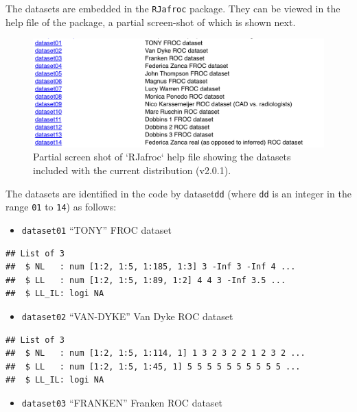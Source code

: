 \documentclass[
]{book}
\providecommand{\tightlist}{%
  \setlength{\itemsep}{0pt}\setlength{\parskip}{0pt}}
\begin{document}
The datasets are embedded in the \texttt{RJafroc} package. They can be viewed in the help file of the package, a partial screen-shot of which is shown next.

\begin{figure}

{\centering \includegraphics{images/compare-3-fits/datasets} 

}

\caption{Partial screen shot of `RJafroc` help file showing the datasets included with the current distribution (v2.0.1).}\label{fig:datasets-datasets}
\end{figure}

The datasets are identified in the code by dataset\texttt{dd} (where \texttt{dd} is an integer in the range \texttt{01} to \texttt{14}) as follows:

\begin{itemize}
\tightlist
\item
  \texttt{dataset01} ``TONY'' FROC dataset \citep{RN2125}
\end{itemize}

\begin{verbatim}
## List of 3
##  $ NL   : num [1:2, 1:5, 1:185, 1:3] 3 -Inf 3 -Inf 4 ...
##  $ LL   : num [1:2, 1:5, 1:89, 1:2] 4 4 3 -Inf 3.5 ...
##  $ LL_IL: logi NA
\end{verbatim}

\begin{itemize}
\tightlist
\item
  \texttt{dataset02} ``VAN-DYKE'' Van Dyke ROC dataset \citep{RN1993}
\end{itemize}

\begin{verbatim}
## List of 3
##  $ NL   : num [1:2, 1:5, 1:114, 1] 1 3 2 3 2 2 1 2 3 2 ...
##  $ LL   : num [1:2, 1:5, 1:45, 1] 5 5 5 5 5 5 5 5 5 5 ...
##  $ LL_IL: logi NA
\end{verbatim}

\begin{itemize}
\tightlist
\item
  \texttt{dataset03} ``FRANKEN'' Franken ROC dataset \citep{RN1995}
\end{itemize}
\end{document}
